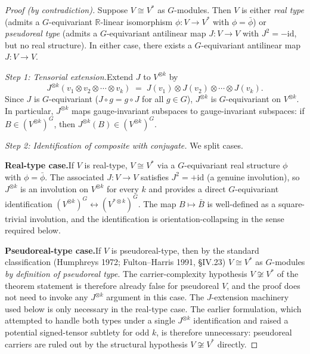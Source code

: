 \documentclass[11pt]{article}
\theoremstyle{definition}
\begin{document}
\begin{proof}[Proof (by contradiction)]

Suppose $V \cong V^*$ as $G$-modules.  Then $V$ is either \emph{real type}
(admits a $G$-equivariant $\mathbb{R}$-linear isomorphism $\phi: V \to V^*$
with $\phi = \bar\phi$) or \emph{pseudoreal type} (admits a $G$-equivariant
antilinear map $J: V \to V$ with $J^2 = -\mathrm{id}$, but no real structure).
In either case, there exists a $G$-equivariant antilinear map
$J: V \to V$.

\textit{Step 1: Tensorial extension.}\quad Extend $J$ to $V^{\otimes k}$ by
\[
  J^{\otimes k}(v_1 \otimes v_2 \otimes \cdots \otimes v_k)
  \;=\; J(v_1) \otimes J(v_2) \otimes \cdots \otimes J(v_k).
\]
Since $J$ is $G$-equivariant ($J \circ g = g \circ J$ for all $g \in G$),
$J^{\otimes k}$ is $G$-equivariant on $V^{\otimes k}$.  In particular,
$J^{\otimes k}$ maps gauge-invariant subspaces to gauge-invariant subspaces:
if $B \in (V^{\otimes k})^G$, then $J^{\otimes k}(B) \in (V^{\otimes k})^G$.

\textit{Step 2: Identification of composite with conjugate.}\quad
We split cases.

\smallskip\noindent\textbf{Real-type case.}\quad If $V$ is real-type,
$V \cong V^*$ via a $G$-equivariant real structure $\phi$ with
$\phi = \bar\phi$.  The associated $J: V \to V$ satisfies $J^2 = +\mathrm{id}$
(a genuine involution), so $J^{\otimes k}$ is an involution on $V^{\otimes k}$
for every $k$ and provides a direct $G$-equivariant identification
$(V^{\otimes k})^G \leftrightarrow (V^{*\otimes k})^G$.  The map
$B \mapsto \bar B$ is well-defined as a square-trivial involution, and
the identification is orientation-collapsing in the sense required below.

\smallskip\noindent\textbf{Pseudoreal-type case.}\quad If $V$ is pseudoreal-type,
then by the standard classification (Humphreys 1972; Fulton--Harris 1991,
\S IV.23) $V \cong V^*$ as $G$-modules \emph{by definition of pseudoreal
type}.  The carrier-complexity hypothesis $V \not\cong V^*$ of the theorem
statement is therefore already false for pseudoreal $V$, and the proof
does not need to invoke any $J^{\otimes k}$ argument in this case.
The $J$-extension machinery used below is only necessary in the real-type
case.  The earlier formulation, which attempted to handle both types
under a single $J^{\otimes k}$ identification and raised a potential
signed-tensor subtlety for odd $k$, is therefore unnecessary: pseudoreal
carriers are ruled out by the structural hypothesis $V \not\cong V^*$
directly.


\end{proof}
\end{document}

